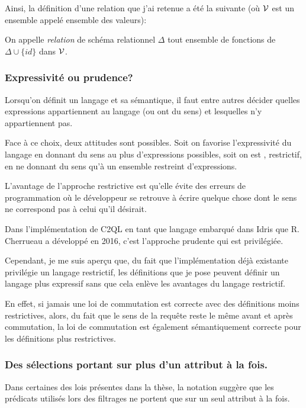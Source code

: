 Ainsi, la définition d'une relation que j'ai retenue a été la suivante
(où $\mathcal{V}$ est un ensemble appelé ensemble des valeurs):

\begin{defi*}
	On appelle \emph{relation} de schéma relationnel $\Delta$
	tout ensemble de fonctions de $\Delta \cup \{ id \}$ dans $\mathcal{V}$.
\end{defi*}

\subsubsection*{Expressivité ou prudence?}
Lorsqu'on définit un langage et sa sémantique, il faut entre autres
décider quelles expressions appartiennent au langage
(ou \og ont du sens\fg{}) et lesquelles n'y appartiennent pas.

Face à ce choix, deux attitudes sont possibles.
Soit on favorise l'expressivité du langage en donnant du sens
au plus d'expressions possibles, soit on est , restrictif,
en ne donnant du sens qu'à un ensemble restreint d'expressions.

L'avantage de l'approche restrictive est qu'elle évite des erreurs de programmation
où le développeur se retrouve à écrire quelque chose dont le sens
ne correspond pas à celui qu'il désirait.

Dans l'implémentation de C2QL en tant que langage embarqué dans Idris
que R. Cherrueau a développé en 2016, c'est l'approche
\og prudente \fg{} qui est privilégiée.

Cependant, je me suis aperçu que, du fait que l'implémentation
déjà existante privilégie un langage restrictif,
les définitions que je pose peuvent définir un langage plus
expressif sans que cela enlève
les avantages du langage restrictif.

En effet, si jamais une loi de commutation est correcte avec des définitions
moins restrictives, alors, du fait que le sens de la requête reste le même avant et après
commutation, la loi de commutation est également sémantiquement correcte pour
les définitions plus restrictives.

\subsubsection*{Des sélections portant sur plus d'un attribut à la fois.}
Dans certaines des lois présentes dans la thèse, la notation
suggère que les prédicats utilisés lors des filtrages ne portent que sur
un seul attribut à la fois.

